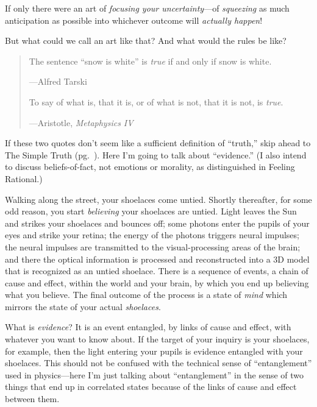 {
 If only there were an art of \textit{focusing your
uncertainty}{}---of \textit{squeezing} as much anticipation as possible
into whichever outcome will \textit{actually happen}!}

{
 But what could we call an art like that? And what would the rules
be like?}

\myendsectiontext


\begin{quote}
{
 The sentence ``snow is white''
is \textit{true} if and only if snow is white.}

{\raggedleft
 {}---Alfred Tarski
\par}

{
 To say of what is, that it is, or of what is not, that it is not,
is \textit{true}.}

{\raggedleft
 {}---Aristotle, \textit{Metaphysics IV}
\par}
\end{quote}


{
 If these two quotes don't seem like a sufficient
definition of ``truth,'' skip ahead
to The Simple Truth (pg.\ \pageref{the_simple_truth}). Here I'm going to talk about
``evidence.'' (I also intend to
discuss beliefs-of-fact, not emotions or morality, as distinguished in
Feeling Rational.)}

{
 Walking along the street, your shoelaces come untied. Shortly
thereafter, for some odd reason, you start \textit{believing} your
shoelaces are untied. Light leaves the Sun and strikes your shoelaces
and bounces off; some photons enter the pupils of your eyes and strike
your retina; the energy of the photons triggers neural impulses; the
neural impulses are transmitted to the visual-processing areas of the
brain; and there the optical information is processed and reconstructed
into a 3D model that is recognized as an untied shoelace. There is a
sequence of events, a chain of cause and effect, within the world and
your brain, by which you end up believing what you believe. The final
outcome of the process is a state of \textit{mind} which mirrors the
state of your actual \textit{shoelaces}.}

{
 What is \textit{evidence}? It is an event entangled, by links of
cause and effect, with whatever you want to know about. If the target
of your inquiry is your shoelaces, for example, then the light entering
your pupils is evidence entangled with your shoelaces. This should not
be confused with the technical sense of
``entanglement'' used in
physics---here I'm just talking about
``entanglement'' in the sense of two
things that end up in correlated states because of the links of cause
and effect between them.}

